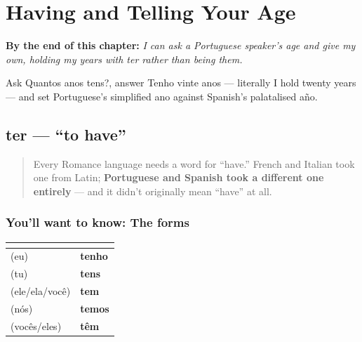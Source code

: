 
\chapter{Having and Telling Your Age}
\label{ch:pt-having-and-age}

\begin{chapteropening}
\textbf{By the end of this chapter:} \emph{I can ask a Portuguese speaker's age and give my own, holding my years with ter rather than being them.}

Ask Quantos anos tens?, answer Tenho vinte anos — literally I hold twenty years — and set Portuguese's simplified ano against Spanish's palatalised año.
\end{chapteropening}

\section[ter]{ter — \textquotedblleft{}to have\textquotedblright{}}

\label{lesson:PT-C14-ter}



\begin{quote}
Every Romance language needs a word for \textquotedblleft{}have.\textquotedblright{} French and Italian took one from Latin; \textbf{Portuguese and Spanish took a different one entirely} — and it didn't originally mean \textquotedblleft{}have\textquotedblright{} at all.
\end{quote}

\subsection*{You'll want to know: The forms}
\noindent
\begin{tabularx}{\linewidth}{@{}>{\raggedright\arraybackslash}X>{\raggedright\arraybackslash}X@{}}
\toprule
\textbf{} & \textbf{} \\
\midrule
(eu) & \textbf{tenho} \\
(tu) & \textbf{tens} \\
(ele/ela/você) & \textbf{tem} \\
(nós) & \textbf{temos} \\
(vocês/eles) & \textbf{têm} \\
\bottomrule
\end{tabularx}

